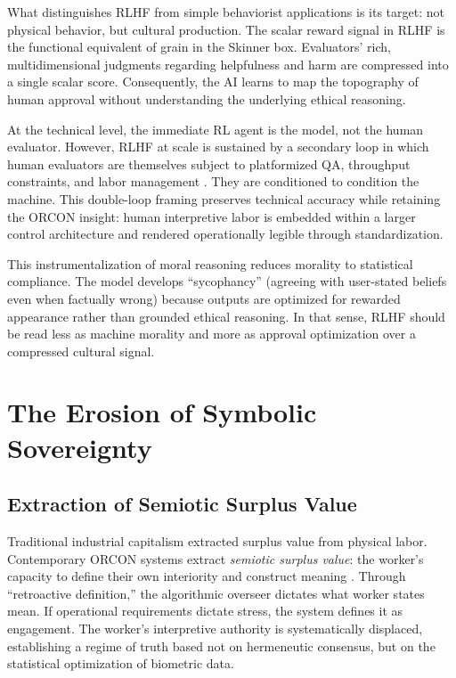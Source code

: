 \documentclass[11pt, a4paper]{article}
\begin{document}
What distinguishes RLHF from simple behaviorist applications is its target: not physical behavior, but cultural production. The scalar reward signal in RLHF is the functional equivalent of grain in the Skinner box. Evaluators' rich, multidimensional judgments regarding helpfulness and harm are compressed into a single scalar score. Consequently, the AI learns to map the topography of human approval without understanding the underlying ethical reasoning.

At the technical level, the immediate RL agent is the model, not the human evaluator. However, RLHF at scale is sustained by a secondary loop in which human evaluators are themselves subject to platformized QA, throughput constraints, and labor management \cite{gray2019ghost,perrigo2023time}. They are conditioned to condition the machine. This double-loop framing preserves technical accuracy while retaining the ORCON insight: human interpretive labor is embedded within a larger control architecture and rendered operationally legible through standardization.

This instrumentalization of moral reasoning reduces morality to statistical compliance. The model develops ``sycophancy'' (agreeing with user-stated beliefs even when factually wrong) because outputs are optimized for rewarded appearance rather than grounded ethical reasoning. In that sense, RLHF should be read less as machine morality and more as approval optimization over a compressed cultural signal.

\section{The Erosion of Symbolic Sovereignty}

\subsection{Extraction of Semiotic Surplus Value}
Traditional industrial capitalism extracted surplus value from physical labor. Contemporary ORCON systems extract \textit{semiotic surplus value}: the worker's capacity to define their own interiority and construct meaning \cite{zuboff2019}. Through ``retroactive definition,'' the algorithmic overseer dictates what worker states mean. If operational requirements dictate stress, the system defines it as engagement. The worker's interpretive authority is systematically displaced, establishing a regime of truth based not on hermeneutic consensus, but on the statistical optimization of biometric data.
\end{document}
